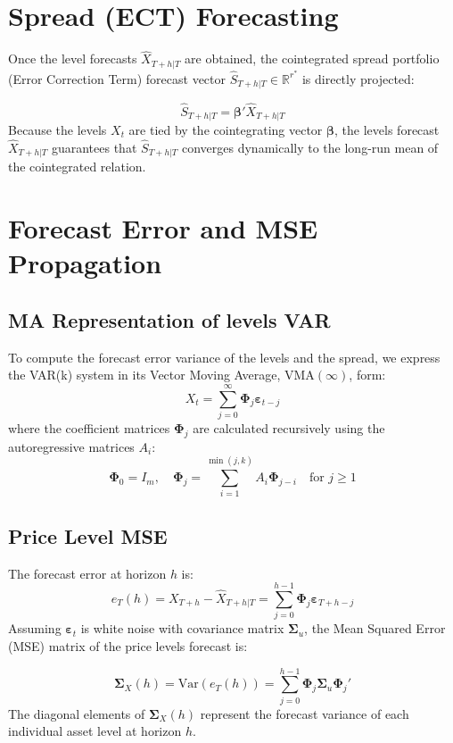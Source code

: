 \documentclass[10pt,a4paper,twocolumn]{article}
\newcommand{\bbeta}{\boldsymbol{\beta}}
\newcommand{\bSigma}{\boldsymbol{\Sigma}}
\newcommand{\bPhi}{\boldsymbol{\Phi}}
\newcommand{\beps}{\boldsymbol{\varepsilon}}
\begin{document}
\section{Spread (ECT) Forecasting}

Once the level forecasts $\hat{X}_{T+h|T}$ are obtained, the cointegrated spread portfolio (Error Correction Term) forecast vector $\hat{S}_{T+h|T} \in \mathbb{R}^{r^*}$ is directly projected:

\begin{tcolorbox}[mathbox={ECT Portfolio Forecast}]
\begin{equation}\label{eq:ect_fc}
  \hat{S}_{T+h|T} = \bbeta' \hat{X}_{T+h|T}
\end{equation}
Because the levels $X_t$ are tied by the cointegrating vector $\bbeta$, the levels forecast $\hat{X}_{T+h|T}$ guarantees that $\hat{S}_{T+h|T}$ converges dynamically to the long-run mean of the cointegrated relation.
\end{tcolorbox}

\section{Forecast Error and MSE Propagation}

\subsection{MA Representation of levels VAR}
To compute the forecast error variance of the levels and the spread, we express the VAR(k) system in its Vector Moving Average, $\text{VMA}(\infty)$, form:
\[
  X_t = \sum_{j=0}^{\infty} \bPhi_j \beps_{t-j}
\]
where the coefficient matrices $\bPhi_j$ are calculated recursively using the autoregressive matrices $A_i$:
\begin{equation}
  \bPhi_0 = I_m, \quad \bPhi_j = \sum_{i=1}^{\min(j, k)} A_i \bPhi_{j-i} \quad \text{for } j \ge 1
  \label{eq:ma_coef}
\end{equation}

\subsection{Price Level MSE}
The forecast error at horizon $h$ is:
\[
  e_{T}(h) = X_{T+h} - \hat{X}_{T+h|T} = \sum_{j=0}^{h-1} \bPhi_j \beps_{T+h-j}
\]
Assuming $\beps_t$ is white noise with covariance matrix $\bSigma_u$, the Mean Squared Error (MSE) matrix of the price levels forecast is:
\begin{tcolorbox}[mathbox={Levels Forecast MSE Matrix}]
\begin{equation}
  \bSigma_X(h) = \text{Var}(e_{T}(h)) = \sum_{j=0}^{h-1} \bPhi_j \bSigma_u \bPhi_j'
  \label{eq:levels_mse}
\end{equation}
The diagonal elements of $\bSigma_X(h)$ represent the forecast variance of each individual asset level at horizon $h$.
\end{tcolorbox}
\end{document}
